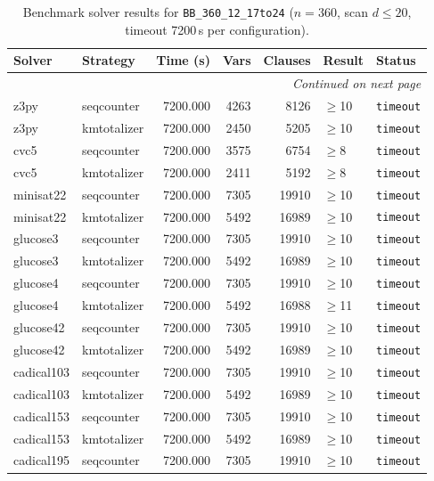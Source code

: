 \begin{longtable}{llrrrl p{}}
\caption{Benchmark solver results for \texttt{BB\_360\_12\_17to24} ($n=360$, scan $d \leq 20$, timeout 7200\,s per configuration).} \label{tab:bench-BB_360_12_17to24} \\
\toprule
Solver & Strategy & Time (s) & Vars & Clauses & Result & Status \\
\midrule
\endhead
\midrule
\multicolumn{7}{r}{\textit{Continued on next page}} \\
\midrule
\endfoot
\bottomrule
\endlastfoot
z3py & seqcounter & 7200.000 & 4263 & 8126 & $\geq$10 & \texttt{timeout} \\
z3py & kmtotalizer & 7200.000 & 2450 & 5205 & $\geq$10 & \texttt{timeout} \\
cvc5 & seqcounter & 7200.000 & 3575 & 6754 & $\geq$8 & \texttt{timeout} \\
cvc5 & kmtotalizer & 7200.000 & 2411 & 5192 & $\geq$8 & \texttt{timeout} \\
minisat22 & seqcounter & 7200.000 & 7305 & 19910 & $\geq$10 & \texttt{timeout} \\
minisat22 & kmtotalizer & 7200.000 & 5492 & 16989 & $\geq$10 & \texttt{timeout} \\
glucose3 & seqcounter & 7200.000 & 7305 & 19910 & $\geq$10 & \texttt{timeout} \\
glucose3 & kmtotalizer & 7200.000 & 5492 & 16989 & $\geq$10 & \texttt{timeout} \\
glucose4 & seqcounter & 7200.000 & 7305 & 19910 & $\geq$10 & \texttt{timeout} \\
glucose4 & kmtotalizer & 7200.000 & 5492 & 16988 & $\geq$11 & \texttt{timeout} \\
glucose42 & seqcounter & 7200.000 & 7305 & 19910 & $\geq$10 & \texttt{timeout} \\
glucose42 & kmtotalizer & 7200.000 & 5492 & 16989 & $\geq$10 & \texttt{timeout} \\
cadical103 & seqcounter & 7200.000 & 7305 & 19910 & $\geq$10 & \texttt{timeout} \\
cadical103 & kmtotalizer & 7200.000 & 5492 & 16989 & $\geq$10 & \texttt{timeout} \\
cadical153 & seqcounter & 7200.000 & 7305 & 19910 & $\geq$10 & \texttt{timeout} \\
cadical153 & kmtotalizer & 7200.000 & 5492 & 16989 & $\geq$10 & \texttt{timeout} \\
cadical195 & seqcounter & 7200.000 & 7305 & 19910 & $\geq$10 & \texttt{timeout} \\

\end{longtable}
